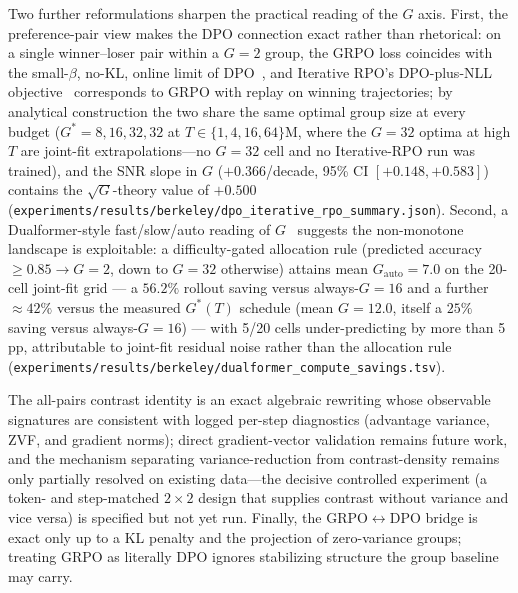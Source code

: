 Two further reformulations sharpen the practical reading of the $G$ axis.
First, the preference-pair view makes the DPO connection exact rather than
rhetorical: on a single winner--loser pair within a $G{=}2$ group, the GRPO
loss coincides with the small-$\beta$, no-KL, online limit of
DPO~\citep{rafailov2024direct}, and Iterative RPO's DPO-plus-NLL
objective~\citep{pang2024iterativerpo} corresponds to GRPO with replay on
winning trajectories; by analytical construction the two share the same
optimal group size at every budget ($G^\ast = 8, 16, 32, 32$ at
$T \in \{1, 4, 16, 64\}\mathrm{M}$, where the $G{=}32$ optima at high $T$
are joint-fit extrapolations---no $G{=}32$ cell and no Iterative-RPO run
was trained), and the SNR slope in $G$
($+0.366$/decade, 95\% CI $[+0.148, +0.583]$) contains the
$\sqrt{G}$-theory value of $+0.500$
(\texttt{experiments/results/berkeley/dpo\_iterative\_rpo\_summary.json}).
Second, a Dualformer-style fast/slow/auto reading of
$G$~\citep{su2024dualformer} suggests the non-monotone landscape is
exploitable: a difficulty-gated allocation rule (predicted accuracy
$\geq 0.85 \to G{=}2$, down to $G{=}32$ otherwise) attains mean
$G_{\mathrm{auto}} = 7.0$ on the 20-cell joint-fit grid --- a $56.2\%$
rollout saving versus always-$G{=}16$ and a further $\approx 42\%$ versus
the measured $G^\ast(T)$ schedule (mean $G{=}12.0$, itself a $25\%$
saving versus always-$G{=}16$) --- with 5/20 cells under-predicting by more than 5\,pp,
attributable to joint-fit residual noise rather than the allocation rule
(\texttt{experiments/results/berkeley/dualformer\_compute\_savings.tsv}).

The all-pairs contrast identity is an exact algebraic rewriting whose
observable signatures are consistent with logged per-step diagnostics
(advantage variance, ZVF, and gradient norms); direct gradient-vector validation
remains future work, and the
mechanism separating
variance-reduction from contrast-density remains only partially resolved on
existing data---the decisive controlled experiment (a token- and step-matched
$2{\times}2$ design that supplies contrast without variance and vice versa) is
specified but not yet run. Finally, the GRPO$\leftrightarrow$DPO bridge is exact
only up to a KL penalty and the projection of zero-variance groups; treating GRPO
as literally DPO ignores stabilizing structure the group baseline may carry.


